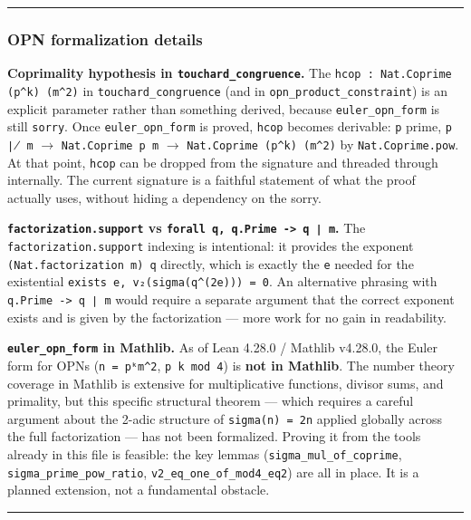 \documentclass[12pt,a4paper]{article}
\begin{document}
\begin{center}
\rule{0.5\textwidth}{0.4pt}
\end{center}

\subsubsection{OPN formalization details}

\textbf{Coprimality hypothesis in \texttt{touchard\_congruence}.} The \texttt{hcop : Nat.Coprime (p\^{}k) (m\^{}2)} in
\texttt{touchard\_congruence} (and in \texttt{opn\_product\_constraint}) is an explicit parameter rather than
something derived, because \texttt{euler\_opn\_form} is still \texttt{sorry}. Once \texttt{euler\_opn\_form} is proved,
\texttt{hcop} becomes derivable: \texttt{p} prime, \texttt{p ∤ m} $\rightarrow$ \texttt{Nat.Coprime p m} $\rightarrow$
\texttt{Nat.Coprime (p\^{}k) (m\^{}2)} by \texttt{Nat.Coprime.pow}. At that point, \texttt{hcop} can be dropped from the
signature and threaded through internally. The current signature is a faithful statement of what
the proof actually uses, without hiding a dependency on the sorry.

\textbf{\texttt{factorization.support} vs \texttt{forall q, q.Prime -\textgreater{} q ∣ m}.} The \texttt{factorization.support} indexing is
intentional: it provides the exponent \texttt{(Nat.factorization m) q} directly, which is exactly the
\texttt{e} needed for the existential \texttt{exists e, v₂(sigma(q\^{}(2e))) = 0}. An alternative phrasing with
\texttt{q.Prime -\textgreater{} q ∣ m} would require a separate argument that the correct exponent exists and is
given by the factorization --- more work for no gain in readability.

\textbf{\texttt{euler\_opn\_form} in Mathlib.} As of Lean 4.28.0 / Mathlib v4.28.0, the Euler form for OPNs
(\texttt{n = pᵏm\^{}2}, \texttt{p \equiv k  mod 4}) is \textbf{not in Mathlib}. The number theory coverage in Mathlib
is extensive for multiplicative functions, divisor sums, and primality, but this specific
structural theorem --- which requires a careful argument about the 2-adic structure of \texttt{sigma(n) = 2n}
applied globally across the full factorization --- has not been formalized. Proving it from the
tools already in this file is feasible: the key lemmas (\texttt{sigma\_mul\_of\_coprime},
\texttt{sigma\_prime\_pow\_ratio}, \texttt{v2\_eq\_one\_of\_mod4\_eq2}) are all in place. It is a planned extension,
not a fundamental obstacle.

\begin{center}
\rule{0.5\textwidth}{0.4pt}
\end{center}
\end{document}
